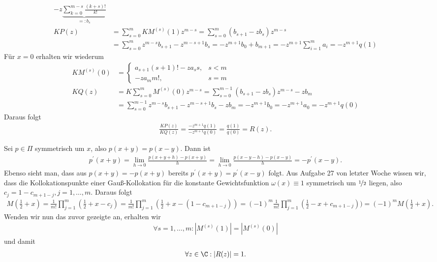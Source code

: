 \begin{solution}
\begin{align*}
  - z\underbrace{\sum_{k=0}^{m-s}\frac{(k+s)!}{k!}}_{=: b_s} \\
  KP(z) &= \sum_{s=0}^m KM^{(s)}(1)z^{m-s} = \sum_{s=0}^m (b_{s+1} - zb_s)z^{m-s} \\
  &= \sum_{s=0}^m z^{m-s}b_{s+1} - z^{m-s+1}b_s
  = -z^{m+1}b_0 + b_{m+1}
  = -z^{m+1}\sum_{i=1}^m a_i
  = -z^{m+1}q(1)
\end{align*}
Für $x=0$ erhalten wir wiederum
\begin{align*}
  KM^{(s)}(0) &= \begin{cases}
    a_{s+1}(s+1)! - za_ss, & s < m \\
    -za_mm!, & s = m
  \end{cases} \\
  KQ(z) &= K\sum_{s=0}^m M^{(s)}(0)z^{m-s} = \sum_{s=0}^{m-1}(b_{s+1}-zb_s)z^{m-s} - zb_m \\
  &= \sum_{s=0}^{m-1}z^{m-s}b_{s+1} - z^{m-s+1}b_s - zb_m
  = -z^{m+1}b_0
  = -z^{m+1}a_0
  = -z^{m+1}q(0)
\end{align*}
Daraus folgt
\begin{align*}
  \frac{KP(z)}{KQ(z)} = \frac{-z^{m+1}q(1)}{-z^{m+1}q(0)} = \frac{q(1)}{q(0)} = R(z).
\end{align*}
\item Sei $p \in \Pi$ symmetrisch um $x$,
also $p(x+y) = p(x-y)$.
Dann ist
\begin{align*}
  p^{\prime}(x+y) = \lim_{h \rightarrow 0}\frac{p(x+y+h)-p(x+y)}{h}
  = \lim_{h \rightarrow 0}\frac{p(x-y-h)-p(x-y)}{h}
  = -p^{\prime}(x-y).
\end{align*}
Ebenso sieht man, dass aus $p(x+y) = -p(x+y)$ bereits $p^{\prime}(x+y) = p^{\prime}(x-y)$ folgt.
Aus Aufgabe 27 von letzter Woche wissen wir, dass die Kollokationspunkte einer
Gauß-Kollokation für die konstante Gewichtsfunktion $\omega(x) \equiv 1$
symmetrisch um $\nicefrac{1}{2}$ liegen, also $c_j = 1 - c_{m+1-j}, j = 1,\dots,m$.
Daraus folgt
\begin{align*}
  M(\frac{1}{2}+x) = \frac{1}{m!}\prod_{j=1}^m(\frac{1}{2}+x-c_j)
  = \frac{1}{m!}\prod_{j=1}^m(\frac{1}{2}+x - (1 - c_{m+1-j}))
  = (-1)^m\frac{1}{m!}\prod_{j=1}^m(\frac{1}{2}-x + c_{m+1-j}))
  = (-1)^m M(\frac{1}{2}+x).
\end{align*}
Wenden wir nun das zuvor gezeigte an, erhalten wir
\begin{align*}
  \forall s = 1,\dots,m: |M^{(s)}(1)| = |M^{(s)}(0)|
\end{align*}
und damit
\begin{align*}
  \forall z \in \C: |R(z)| = 1.
\end{align*}
\end{solution}
